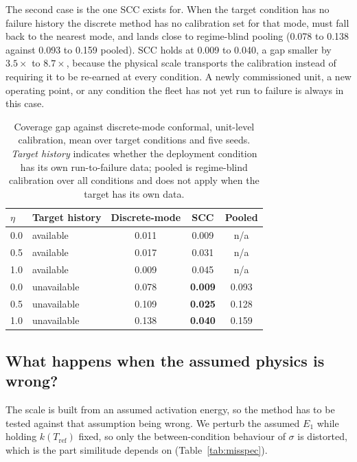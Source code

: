 The second case is the one SCC exists for. When the target condition has no failure history the
discrete method has no calibration set for that mode, must fall back to the nearest mode, and lands
close to regime-blind pooling (0.078 to 0.138 against 0.093 to 0.159 pooled). SCC holds at 0.009 to
0.040, a gap smaller by $3.5\times$ to $8.7\times$, because the physical scale transports the
calibration instead of requiring it to be re-earned at every condition. A newly commissioned unit, a
new operating point, or any condition the fleet has not yet run to failure is always in this case.

\begin{table}[t]\centering\footnotesize
\setlength{\tabcolsep}{10pt}\renewcommand{\arraystretch}{1.2}
\caption{Coverage gap against discrete-mode conformal, unit-level calibration, mean over target
conditions and five seeds. \emph{Target history} indicates whether the deployment condition has its
own run-to-failure data; pooled is regime-blind calibration over all conditions and does not apply
when the target has its own data.}\label{tab:mondrian}
\begin{tabular}{@{}llccc@{}}\toprule
$\eta$ & Target history & Discrete-mode & SCC & Pooled \\\midrule
0.0 & available   & 0.011 & 0.009 & n/a \\
0.5 & available   & 0.017 & 0.031 & n/a \\
1.0 & available   & 0.009 & 0.045 & n/a \\\midrule
0.0 & unavailable & 0.078 & \textbf{0.009} & 0.093 \\
0.5 & unavailable & 0.109 & \textbf{0.025} & 0.128 \\
1.0 & unavailable & 0.138 & \textbf{0.040} & 0.159 \\\bottomrule
\end{tabular}
\end{table}

\subsection{What happens when the assumed physics is wrong?}\label{sec:res-misspec}
The scale is built from an assumed activation energy, so the method has to be tested against that
assumption being wrong. We perturb the assumed $E_1$ while holding $k(T_{\mathrm{ref}})$ fixed, so
only the between-condition behaviour of $\sigma$ is distorted, which is the part similitude depends
on (Table~\ref{tab:misspec}).

